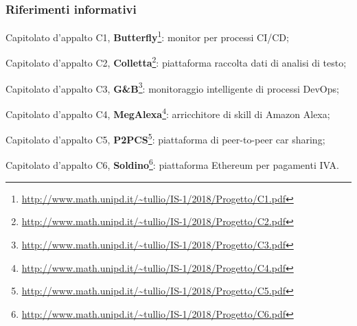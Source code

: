         \subsubsection{Riferimenti informativi}
            \begin{itemize}
                {\hypersetup{urlcolor=blue}
                \item Capitolato d'appalto C1, \textbf{Butterfly}\footnote{\url{http://www.math.unipd.it/~tullio/IS-1/2018/Progetto/C1.pdf}}:
                    monitor per processi CI/CD;
                \item Capitolato d'appalto C2, \textbf{Colletta}\footnote{\url{http://www.math.unipd.it/~tullio/IS-1/2018/Progetto/C2.pdf}}:
                    piattaforma raccolta dati di analisi di testo;
                \item Capitolato d'appalto C3, \textbf{G\&B}\footnote{\url{http://www.math.unipd.it/~tullio/IS-1/2018/Progetto/C3.pdf}}:
                    monitoraggio intelligente di processi DevOps;
                \item Capitolato d'appalto C4, \textbf{MegAlexa}\footnote{\url{http://www.math.unipd.it/~tullio/IS-1/2018/Progetto/C4.pdf}}:
                    arricchitore di skill di Amazon Alexa;
                \item Capitolato d'appalto C5, \textbf{P2PCS}\footnote{\url{http://www.math.unipd.it/~tullio/IS-1/2018/Progetto/C5.pdf}}:
                    piattaforma di peer-to-peer car sharing;
                \item Capitolato d'appalto C6, \textbf{Soldino}\footnote{\url{http://www.math.unipd.it/~tullio/IS-1/2018/Progetto/C6.pdf}}:
                    piattaforma Ethereum per pagamenti IVA.
                }
        	\end{itemize}